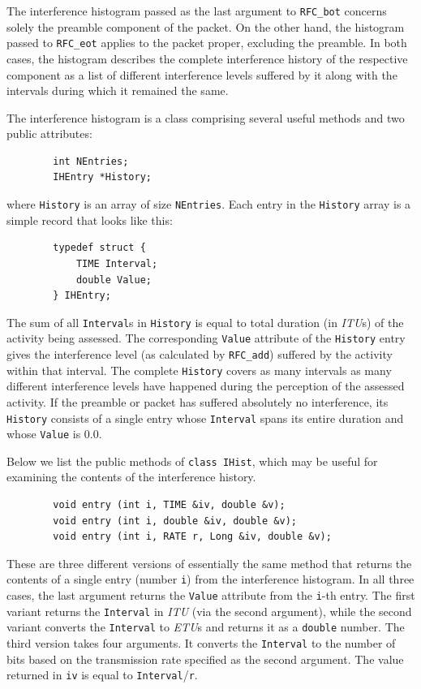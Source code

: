The interference histogram passed as the last argument to
{\tt RFC\_bot} concerns solely the preamble component of the packet.
On the other hand, the histogram passed to
{\tt RFC\_eot}
applies to the packet proper, excluding the preamble.
In both cases, the histogram describes the complete interference
history of the respective component as a list of different interference
levels suffered by it along with the intervals during which it remained
the same.

The interference histogram is 
a class comprising several useful methods and two public attributes:
\begin{verbatim}
        int NEntries;
        IHEntry *History;
\end{verbatim}
\noindent
where {\tt History} is an array of size {\tt NEntries}.
Each entry in the {\tt History} array is a simple record that looks
like this:
\begin{verbatim}
        typedef struct {
            TIME Interval;
            double Value;
        } IHEntry;
\end{verbatim}

The sum of all {\tt Interval}s in {\tt History} is equal to total duration
(in {\em ITU\/}s) of the activity being assessed.
The corresponding {\tt Value} attribute of the {\tt History} entry gives the
interference level (as calculated by
{\tt RFC\_add}) suffered by the activity within that interval.
The complete {\tt History} covers as many intervals as many different
interference levels have happened during the perception of the
assessed activity.
If the preamble or packet
has suffered absolutely no interference, its
{\tt History} consists of a single entry whose {\tt Interval} spans its
entire duration and whose {\tt Value} is 0.0.

Below we list the public methods of {\tt class IHist}, which may be useful
for examining the contents of the interference history.

\begin{verbatim}
        void entry (int i, TIME &iv, double &v);
        void entry (int i, double &iv, double &v);
        void entry (int i, RATE r, Long &iv, double &v);
\end{verbatim}
\noindent
These are three different versions of essentially the same
method that returns the contents of
a single entry (number {\tt i}) from the interference histogram.
In all three cases, the last argument returns the {\tt Value} attribute from
the {\tt i}-th entry.
The first variant returns the {\tt Interval} in {\em ITU\/} (via the
second argument), while the second variant converts the {\tt Interval} to
{\em ETU\/}s and returns it as a {\tt double} number.
The third version takes four arguments.
It converts the {\tt Interval} to the number of bits based on the transmission
rate specified as the second argument.
The value returned in {\tt iv} is equal to {\tt Interval}/{\tt r}.

